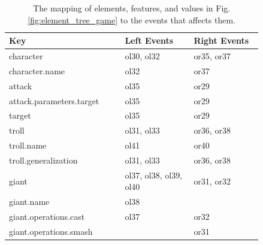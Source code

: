 \begin{table}[]
    \centering
    \caption{The mapping of elements, features, and values in Fig. \ref{fig:element_tree_game} to the events that affects them.}
    \label{tab:keyeventsmap}
    \begin{scriptsize}
    \begin{tabular}{|m{0.38\linewidth}|m{0.23\linewidth}|m{0.23\linewidth}|}
        \hline
        \textbf{Key} & \textbf{Left Events} & \textbf{Right Events} \\ \hline
        character                          & ol30, ol32                                & or35, or37                                 \\ \hline
        character.name                     & ol32                                      & or37                                       \\ \hline
        attack                             & ol35                                      & or29                                       \\ \hline
        attack.parameters.target           & ol35                                      & or29                                       \\ \hline
        target                             & ol35                                      & or29                                       \\ \hline
        troll                              & ol31, ol33                                & or36, or38                                 \\ \hline
        troll.name                         & ol41                                      & or40                                       \\ \hline
        troll.generalization               & ol31, ol33                                & or36, or38                                 \\ \hline
        giant                              & ol37, ol38, ol39, ol40                    & or31, or32                                 \\ \hline
        giant.name                         & ol38                                      &                                            \\ \hline
        giant.operations.cast              & ol37                                      & or32                                       \\ \hline
        giant.operations.smash             &                                           & or31                                       \\ \hline

\end{tabular}
\end{scriptsize}
\end{table}
